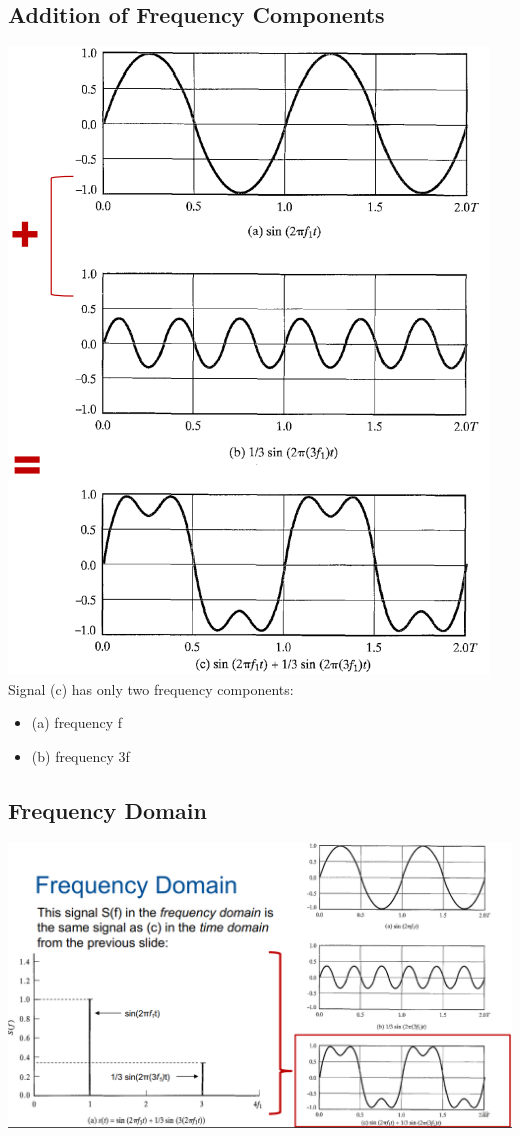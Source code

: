 \documentclass[11pt]{article}
\begin{document}
\subsection{Addition of Frequency Components}
\includegraphics[width=\textwidth]{addition-of-frequency-components}
Signal (c) has only two frequency components:
\begin{itemize}
    \item (a) frequency f
    \item (b) frequency 3f
\end{itemize}
\subsection{Frequency Domain}
\includegraphics[width=\textwidth]{frequency-domain.png}
\end{document}
